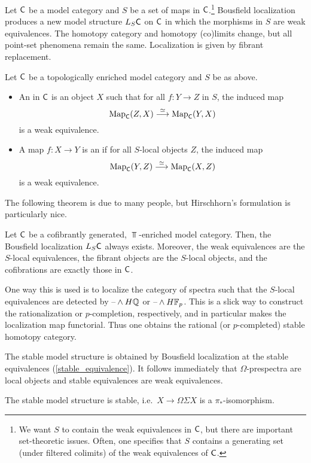 Let $\mathsf C$ be a model category and $S$ be a set of maps in $\mathsf C$.\footnote{We want $S$ to contain the weak
equivalences in $\mathsf C$, but there are important set-theoretic issues. Often, one specifies that $S$ contains a
generating set (under filtered colimits) of the weak equivalences of $\mathsf C$.} Bousfield localization produces a new
model structure $L_S\mathsf C$ on $\mathsf C$ in which the morphisms in $S$ are weak equivalences. The homotopy category and
homotopy (co)limits change, but all point-set phenomena remain the same. Localization is given by fibrant
replacement.
\begin{defn}
Let $\mathsf C$ be a topologically enriched model category and $S$ be as above.
\begin{itemize}
	\item An  in $\mathsf C$ is an object $X$ such that for all $f\colon Y\to Z$ in $S$, the
	induced map
	\[\operatorname{Map}_\mathsf C(Z,X)\stackrel\simeq\longrightarrow \operatorname{Map}_\mathsf C(Y, X)\]
	is a weak equivalence.
	\item A map $f\colon X\to Y$ is an  if for all $S$-local objects $Z$, the induced map
	\[\operatorname{Map}_\mathsf C(Y,Z)\stackrel\simeq\longrightarrow \operatorname{Map}_\mathsf C(X,Z)\]
	is a weak equivalence.
\end{itemize}
\end{defn}
The following theorem is due to many people, but Hirschhorn's formulation is particularly nice.
\begin{thm}
Let $\mathsf C$ be a cofibrantly generated, $\Top$-enriched model category. Then, the Bousfield localization $L_S\mathsf C$
always exists. Moreover, the weak equivalences are the $S$-local equivalences, the fibrant objects are the
$S$-local objects, and the cofibrations are exactly those in $\mathsf C$.
\end{thm}
\begin{exm}
One way this is used is to localize the category of spectra such that the $S$-local equivalences are detected by
$\text{--}\wedge H\mathbb Q$ or $\text{--}\wedge H\mathbb F_p$. This is a slick way to construct the rationalization or $p$-completion,
respectively, and in particular makes the localization map functorial. Thus one obtains the rational (or
$p$-completed) stable homotopy category.
\end{exm}
The stable model structure is obtained by Bousfield localization at the stable equivalences
(\cref{stable_equivalence}). It follows immediately that $\Omega$-prespectra are local objects and stable
equivalences are weak equivalences.
\begin{prop}
The stable model structure is stable, i.e.\ $X\to\Omega\Sigma X$ is a $\pi_*$-isomorphism.
\end{prop}

